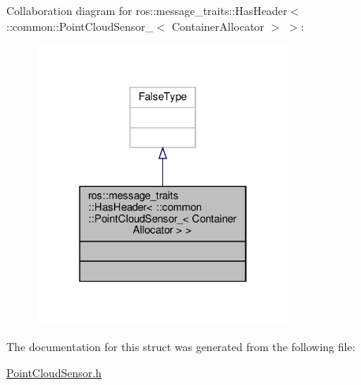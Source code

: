 Collaboration diagram for ros\+:\+:message\+\_\+traits\+:\+:Has\+Header$<$ \+:\+:common\+:\+:Point\+Cloud\+Sensor\+\_\+$<$ Container\+Allocator $>$ $>$\+:\nopagebreak
\begin{figure}[H]
\begin{center}
\leavevmode
\includegraphics[width=238pt]{d0/dc4/structros_1_1message__traits_1_1HasHeader_3_01_1_1common_1_1PointCloudSensor___3_01ContainerAllocator_01_4_01_4__coll__graph}
\end{center}
\end{figure}


The documentation for this struct was generated from the following file\+:\begin{DoxyCompactItemize}
\item 
\hyperlink{PointCloudSensor_8h}{Point\+Cloud\+Sensor.\+h}\end{DoxyCompactItemize}
